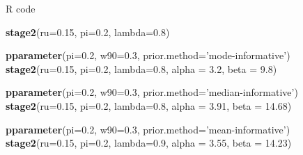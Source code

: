 \documentclass{beamer}
\newenvironment{Shaded}{}{}
\newcommand{\KeywordTok}[1]{\textcolor[rgb]{0.00,0.44,0.13}{\textbf{{#1}}}}
\newcommand{\DataTypeTok}[1]{\textcolor[rgb]{0.56,0.13,0.00}{{#1}}}
\newcommand{\FloatTok}[1]{\textcolor[rgb]{0.25,0.63,0.44}{{#1}}}
\newcommand{\StringTok}[1]{\textcolor[rgb]{0.25,0.44,0.63}{{#1}}}
\newcommand{\NormalTok}[1]{{#1}}
\begin{document}
\begin{frame}[fragile]{R code}

\begin{Shaded}
\begin{Highlighting}[]
\KeywordTok{stage2}\NormalTok{(}\DataTypeTok{ru=}\FloatTok{0.15}\NormalTok{, }\DataTypeTok{pi=}\FloatTok{0.2}\NormalTok{, }\DataTypeTok{lambda=}\FloatTok{0.8}\NormalTok{)}

\KeywordTok{pparameter}\NormalTok{(}\DataTypeTok{pi=}\FloatTok{0.2}\NormalTok{, }\DataTypeTok{w90=}\FloatTok{0.3}\NormalTok{, }\DataTypeTok{prior.method=}\StringTok{'mode-informative'}\NormalTok{)}
\KeywordTok{stage2}\NormalTok{(}\DataTypeTok{ru=}\FloatTok{0.15}\NormalTok{, }\DataTypeTok{pi=}\FloatTok{0.2}\NormalTok{, }\DataTypeTok{lambda=}\FloatTok{0.8}\NormalTok{, }\DataTypeTok{alpha =} \FloatTok{3.2}\NormalTok{, }\DataTypeTok{beta =} \FloatTok{9.8}\NormalTok{)}

\KeywordTok{pparameter}\NormalTok{(}\DataTypeTok{pi=}\FloatTok{0.2}\NormalTok{, }\DataTypeTok{w90=}\FloatTok{0.3}\NormalTok{, }\DataTypeTok{prior.method=}\StringTok{'median-informative'}\NormalTok{)}
\KeywordTok{stage2}\NormalTok{(}\DataTypeTok{ru=}\FloatTok{0.15}\NormalTok{, }\DataTypeTok{pi=}\FloatTok{0.2}\NormalTok{, }\DataTypeTok{lambda=}\FloatTok{0.8}\NormalTok{, }\DataTypeTok{alpha =} \FloatTok{3.91}\NormalTok{, }\DataTypeTok{beta =} \FloatTok{14.68}\NormalTok{)}

\KeywordTok{pparameter}\NormalTok{(}\DataTypeTok{pi=}\FloatTok{0.2}\NormalTok{, }\DataTypeTok{w90=}\FloatTok{0.3}\NormalTok{, }\DataTypeTok{prior.method=}\StringTok{'mean-informative'}\NormalTok{)}
\KeywordTok{stage2}\NormalTok{(}\DataTypeTok{ru=}\FloatTok{0.15}\NormalTok{, }\DataTypeTok{pi=}\FloatTok{0.2}\NormalTok{, }\DataTypeTok{lambda=}\FloatTok{0.9}\NormalTok{, }\DataTypeTok{alpha =} \FloatTok{3.55}\NormalTok{, }\DataTypeTok{beta =} \FloatTok{14.23}\NormalTok{)}
\end{Highlighting}
\end{Shaded}

\end{frame}
\end{document}
